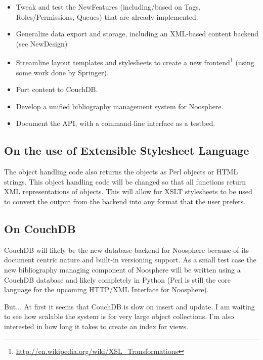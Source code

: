 \begin{itemize}
\item Tweak and test the NewFeatures (including/based on Tags, Roles/Permissions, Queues) that are already implemented.
\item Generalize data export and storage, including an XML-based content backend (see NewDesign)
\item Streamline layout templates and stylesheets to create a new frontend\footnote{\url{http://en.wikipedia.org/wiki/XSL_Transformations}} (using some work done by Springer).
\item Port content to CouchDB.
\item Develop a unified bibliography management system for Noosphere.
\item Document the API, with a command-line interface as a testbed.
\end{itemize}

\subsection*{On the use of Extensible Stylesheet Language}
The object handling code also returns the objects as Perl
objects or HTML strings. This object handling code will be
changed so that all functions return XML representations
of objects. This will allow for XSLT stylesheets to be
used to convert the output from the backend into any
format that the user prefers.

\subsection*{On CouchDB}
CouchDB will likely be the new database backend for
Noosphere because of its document centric nature and
built-in versioning support. As a small test case the new
bibliography managing component of Noosphere will be
written using a CouchDB database and likely completely in
Python (Perl is still the core language for the upcoming
HTTP/XML Interface for Noosphere).

But... At first it seems that CouchDB is slow on insert
and update. I am waiting to see how scalable the system is
for very large object collections. I'm also interested in
how long it takes to create an index for views.
